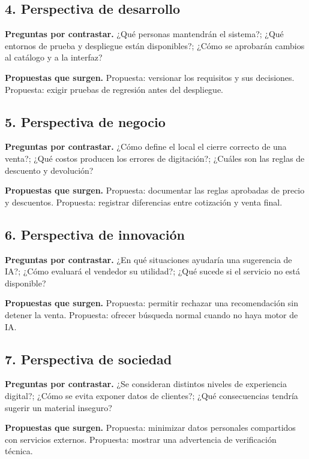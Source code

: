 \subsection{4. Perspectiva de desarrollo}
\noindent\textbf{Preguntas por contrastar.} ¿Qué personas mantendrán el sistema?; ¿Qué entornos de prueba y despliegue están disponibles?; ¿Cómo se aprobarán cambios al catálogo y a la interfaz?\par
\noindent\textbf{Propuestas que surgen.} Propuesta: versionar los requisitos y sus decisiones. Propuesta: exigir pruebas de regresión antes del despliegue.\par
\subsection{5. Perspectiva de negocio}
\noindent\textbf{Preguntas por contrastar.} ¿Cómo define el local el cierre correcto de una venta?; ¿Qué costos producen los errores de digitación?; ¿Cuáles son las reglas de descuento y devolución?\par
\noindent\textbf{Propuestas que surgen.} Propuesta: documentar las reglas aprobadas de precio y descuentos. Propuesta: registrar diferencias entre cotización y venta final.\par
\subsection{6. Perspectiva de innovación}
\noindent\textbf{Preguntas por contrastar.} ¿En qué situaciones ayudaría una sugerencia de IA?; ¿Cómo evaluará el vendedor su utilidad?; ¿Qué sucede si el servicio no está disponible?\par
\noindent\textbf{Propuestas que surgen.} Propuesta: permitir rechazar una recomendación sin detener la venta. Propuesta: ofrecer búsqueda normal cuando no haya motor de IA.\par
\subsection{7. Perspectiva de sociedad}
\noindent\textbf{Preguntas por contrastar.} ¿Se consideran distintos niveles de experiencia digital?; ¿Cómo se evita exponer datos de clientes?; ¿Qué consecuencias tendría sugerir un material inseguro?\par
\noindent\textbf{Propuestas que surgen.} Propuesta: minimizar datos personales compartidos con servicios externos. Propuesta: mostrar una advertencia de verificación técnica.\par
